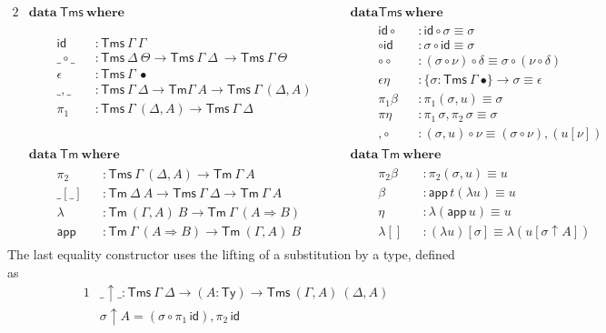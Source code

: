 \documentclass[a4paper,english,cleveref,autoref,draft]{lipics-v2019}
\newcommand{\agdaSymb}[1]{\mathsf{#1}}
\newcommand{\agdaKW}[1]{\mathbf{#1}}
\newcommand{\ind}{\hspace{1em}}
\newcommand{\data}{\agdaKW{data}}
\newcommand{\where}{\agdaKW{where}}
\newcommand{\Ty}{\agdaSymb{Ty}}
\newcommand{\Tms}{\agdaSymb{Tms}}
\newcommand{\Tm}{\agdaSymb{Tm}}
\newcommand{\id}{\agdaSymb{id}}
\newcommand{\app}{\agdaSymb{app}}
\newcommand{\lam}{\lambda}
\newcommand{\Ra}{\Rightarrow}
\begin{document}
\begin{alignat*}{2}
  & \data\ \Tms\ \where && \data \Tms\ \where \\
  & \ind
  \begin{alignedat}{2}
    & \id       && : \Tms\ \Gamma\ \Gamma \\
    & \_\circ\_ && : \Tms\ \Delta\ \Theta \to \Tms\ \Gamma\ \Delta\ \to \Tms\ \Gamma\ \Theta \\
    & \epsilon  && : \Tms\ \Gamma\ \bullet \\
    & \_,\_     && : \Tms\ \Gamma\ \Delta \to \Tm \Gamma\ A \to \Tms\ \Gamma\ (\Delta,A) \quad \\
    & \pi_1     && : \Tms\ \Gamma\ (\Delta,A) \to \Tms\ \Gamma\ \Delta \\
    & && \\ & &&
  \end{alignedat}
  && \ind
  \begin{alignedat}{2}
    & \id\circ && : \id \circ \sigma \equiv \sigma \\
    & \circ\id && : \sigma \circ \id \equiv \sigma \\
    & \circ\circ && : (\sigma \circ \nu) \circ \delta \equiv \sigma \circ (\nu \circ \delta) \\
    & \epsilon\eta && : \{\sigma : \Tms\ \Gamma\ \bullet\} \to \sigma \equiv \epsilon \\
    & \pi_1\beta && : \pi_1(\sigma,u) \equiv \sigma \\
    & \pi\eta  && : \pi_1\,\sigma , \pi_2\,\sigma \equiv \sigma \\
    & ,\circ  && : (\sigma,u) \circ \nu \equiv (\sigma \circ \nu),(u[\nu])
  \end{alignedat} \\
  & \data\ \Tm\ \where && \data\ \Tm\ \where \\
  & \ind
  \begin{alignedat}{2}
    & \pi_2     && : \Tms\ \Gamma\ (\Delta,A) \to \Tm\ \Gamma\ A \\
    & \_[\_]    && : \Tm\ \Delta\ A \to \Tms\ \Gamma\ \Delta \to \Tm\ \Gamma\ A \\
    & \lam      && : \Tm\ (\Gamma,A)\ B \to \Tm\ \Gamma\ (A \Ra B) \\
    & \app      && : \Tm\ \Gamma\ (A \Ra B) \to \Tm\ (\Gamma,A)\ B
  \end{alignedat}
  && \ind
  \begin{alignedat}{2}
    & \pi_2\beta && : \pi_2(\sigma,u) \equiv u \\
    & \beta    && : \app\,t (\lam u) \equiv u \\
    & \eta     && : \lam (\app\, u) \equiv u \\
    & \lam[]   && : (\lam u)[\sigma] \equiv \lam(u[\sigma\uparrow A])
  \end{alignedat}
\end{alignat*}
The last equality constructor uses the lifting of a substitution by a type,
defined as
\begin{alignat*}{1}
  & \_\uparrow\_      : \Tms\ \Gamma\ \Delta \to (A:\Ty) \to \Tms\ (\Gamma,A)\ (\Delta,A) \\
  & \sigma \uparrow A = (\sigma \circ \pi_1\,\id) , \pi_2\,\id
\end{alignat*}
\end{document}
